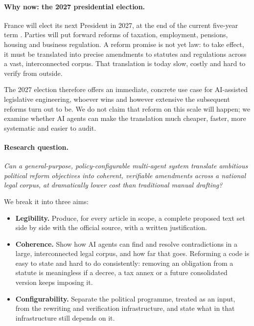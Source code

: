 \documentclass[11pt,a4paper]{article}
\begin{document}
\paragraph{Why now: the 2027 presidential election.}
France will elect its next President in 2027, at the end of the current five-year term \cite{constitution}. Parties will put forward reforms of taxation, employment, pensions, housing and business regulation. A reform promise is not yet law: to take effect, it must be translated into precise amendments to statutes and regulations across a vast, interconnected corpus. That translation is today slow, costly and hard to verify from outside.

The 2027 election therefore offers an immediate, concrete use case for AI-assisted legislative engineering, whoever wins and however extensive the subsequent reforms turn out to be. We do not claim that reform on this scale will happen; we examine whether AI agents can make the translation much cheaper, faster, more systematic and easier to audit.

\paragraph{Research question.}
\emph{Can a general-purpose, policy-configurable multi-agent system translate ambitious political reform objectives into coherent, verifiable amendments across a national legal corpus, at dramatically lower cost than traditional manual drafting?}

We break it into three aims:
\begin{itemize}
  \item \textbf{Legibility.} Produce, for every article in scope, a complete proposed text set side by side with the official source, with a written justification.
  \item \textbf{Coherence.} Show how AI agents can find and resolve contradictions in a large, interconnected legal corpus, and how far that goes. Reforming a code is easy to state and hard to do consistently: removing an obligation from a statute is meaningless if a decree, a tax annex or a future consolidated version keeps imposing it.
  \item \textbf{Configurability.} Separate the political programme, treated as an input, from the rewriting and verification infrastructure, and state what in that infrastructure still depends on it.
\end{itemize}
\end{document}
